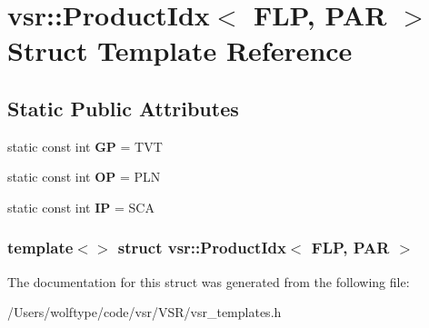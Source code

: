 \hypertarget{structvsr_1_1_product_idx_3_01_f_l_p_00_01_p_a_r_01_4}{\section{vsr\-:\-:Product\-Idx$<$ F\-L\-P, P\-A\-R $>$ Struct Template Reference}
\label{structvsr_1_1_product_idx_3_01_f_l_p_00_01_p_a_r_01_4}
}
\subsection*{Static Public Attributes}
\begin{DoxyCompactItemize}
\item 
\hypertarget{structvsr_1_1_product_idx_3_01_f_l_p_00_01_p_a_r_01_4_ad10f196ee8b533ba1de76a1e1958fef2}{static const int {\bfseries G\-P} = T\-V\-T}\label{structvsr_1_1_product_idx_3_01_f_l_p_00_01_p_a_r_01_4_ad10f196ee8b533ba1de76a1e1958fef2}

\item 
\hypertarget{structvsr_1_1_product_idx_3_01_f_l_p_00_01_p_a_r_01_4_a30188ad7fdebb735dd75cde715e0ad35}{static const int {\bfseries O\-P} = P\-L\-N}\label{structvsr_1_1_product_idx_3_01_f_l_p_00_01_p_a_r_01_4_a30188ad7fdebb735dd75cde715e0ad35}

\item 
\hypertarget{structvsr_1_1_product_idx_3_01_f_l_p_00_01_p_a_r_01_4_a8157c9c8ac4eb5c7c14f5244e2b3e305}{static const int {\bfseries I\-P} = S\-C\-A}\label{structvsr_1_1_product_idx_3_01_f_l_p_00_01_p_a_r_01_4_a8157c9c8ac4eb5c7c14f5244e2b3e305}

\end{DoxyCompactItemize}
\subsubsection*{template$<$$>$ struct vsr\-::\-Product\-Idx$<$ F\-L\-P, P\-A\-R $>$}



The documentation for this struct was generated from the following file\-:\begin{DoxyCompactItemize}
\item 
/\-Users/wolftype/code/vsr/\-V\-S\-R/vsr\-\_\-templates.\-h\end{DoxyCompactItemize}

